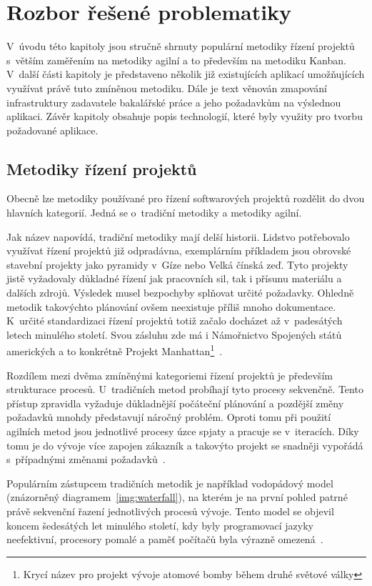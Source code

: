 \chapter{Rozbor řešené problematiky}
V~úvodu této kapitoly jsou stručně shrnuty populární metodiky řízení projektů s~větším zaměřením na metodiky agilní a to především na metodiku Kanban. V~další části kapitoly je představeno několik již existujících aplikací umožňujících využívat právě tuto zmíněnou metodiku. Dále je text věnován zmapování infrastruktury zadavatele bakalářské práce a jeho požadavkům na výslednou aplikaci. Závěr kapitoly obsahuje popis technologií, které byly využity pro tvorbu požadované aplikace.

\section{Metodiky řízení projektů}
Obecně lze metodiky používané pro řízení softwarových projektů rozdělit do dvou hlavních kategorií. Jedná se o~tradiční metodiky a metodiky agilní.

Jak název napovídá, tradiční metodiky mají delší historii. Lidstvo potřebovalo využívat řízení projektů již odpradávna, exemplárním příkladem jsou obrovské stavební projekty jako pyramidy v~Gíze nebo Velká čínská zeď. Tyto projekty jistě vyžadovaly důkladné řízení jak pracovních sil, tak i přísunu materiálu a dalších zdrojů. Výsledek musel bezpochyby splňovat určité požadavky. Ohledně metodik takovýchto plánování ovšem neexistuje příliš mnoho dokumentace. K~určité standardizaci řízení projektů totiž začalo docházet až v~padesátých letech minulého století. Svou zásluhu zde má i Námořnictvo Spojených států amerických a to konkrétně Projekt Manhattan\footnote{Krycí název pro projekt vývoje atomové bomby během druhé světové války}~\cite{bib:project-managment-history}.

Rozdílem mezi dvěma zmíněnými kategoriemi řízení projektů je především strukturace procesů. U~tradičních metod probíhají tyto procesy sekvenčně. Tento přístup zpravidla vyžaduje důkladnější počáteční plánování a pozdější změny požadavků mnohdy představují náročný problém. Oproti tomu při použití agilních metod jsou jednotlivé procesy úzce spjaty a pracuje se v~iteracích. Díky tomu je do vývoje více zapojen zákazník a takovýto projekt se snadněji vypořádá s~případnými změnami požadavků~\cite{bib:agile-vs-traditional}. 

Populárním zástupcem tradičních metodik je například vodopádový model (znázorněný diagramem~\ref{img:waterfall}), na kterém je na první pohled patrné právě sekvenční řazení jednotlivých procesů vývoje. Tento model se objevil koncem šedesátých let minulého století, kdy byly programovací jazyky neefektivní, procesory pomalé a paměť počítačů byla výrazně omezená~\cite{bib:agile-history}. 

